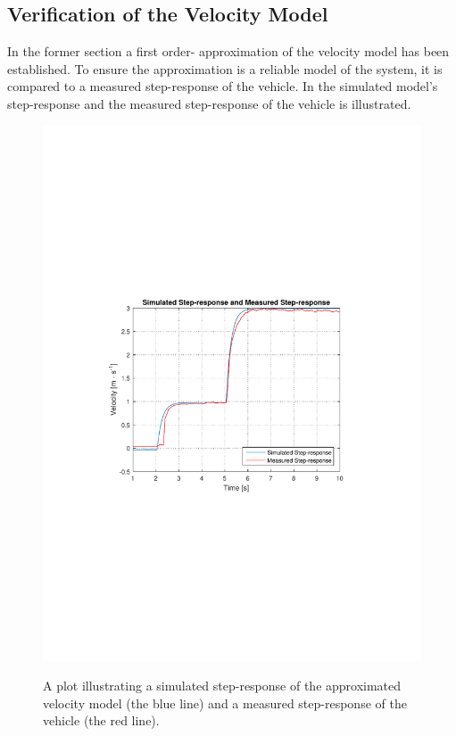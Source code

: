 \subsection{Verification of the Velocity Model}
In the former section a first order- approximation of the velocity model has been established. To ensure the approximation is a reliable model of the system, it is compared to a measured step-response of the vehicle. In  the simulated model's step-response and the measured step-response of the vehicle is illustrated. 

\begin{figure}[H]
  \centering
  {
    \includegraphics[width=1.4\textwidth]{figures/SimulationIRLsteprespons2.pdf}
  }
  \caption{A plot illustrating a simulated step-response of the approximated velocity model (the blue line) and a measured step-response of the vehicle (the red line).}
  \label{SimulationIRLsteprespons2}
\end{figure}

